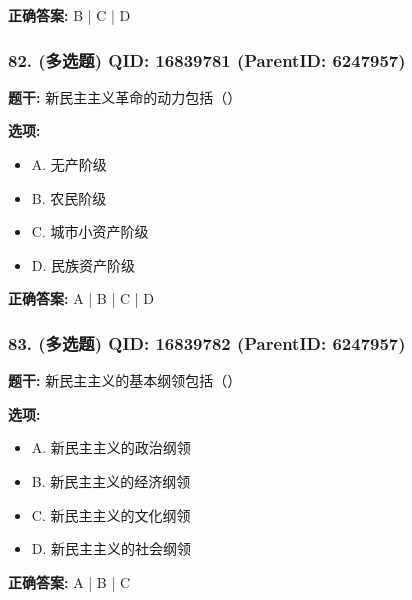 \documentclass[12pt,UTF8]{ctexart}
\begin{document}
\textbf{正确答案:}
B | C | D

\vspace{0.3em}\hrulefill\vspace{0.7em}

\subsubsection*{82. (多选题) \small QID: 16839781 (ParentID: 6247957)}

\textbf{题干:}
新民主主义革命的动力包括（）



\textbf{选项:}
\begin{itemize}[leftmargin=*]

  \item A. 无产阶级

  \item B. 农民阶级

  \item C. 城市小资产阶级

  \item D. 民族资产阶级

\end{itemize}

\textbf{正确答案:}
A | B | C | D

\vspace{0.3em}\hrulefill\vspace{0.7em}

\subsubsection*{83. (多选题) \small QID: 16839782 (ParentID: 6247957)}

\textbf{题干:}
新民主主义的基本纲领包括（）



\textbf{选项:}
\begin{itemize}[leftmargin=*]

  \item A. 新民主主义的政治纲领

  \item B. 新民主主义的经济纲领

  \item C. 新民主主义的文化纲领

  \item D. 新民主主义的社会纲领

\end{itemize}

\textbf{正确答案:}
A | B | C
\end{document}
